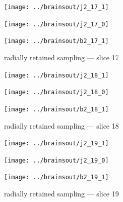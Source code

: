 \documentclass{article}
\begin{document}
\begin{figure}
\begin{centering}

\parbox{\imsize}{\texttt{[image: ../brainsout/j2\_17\_1]}}

\vspace{\vertsep}

\parbox{\imsize}{\texttt{[image: ../brainsout/j2\_17\_0]}}

\vspace{\vertsep}

\parbox{\imsize}{\texttt{[image: ../brainsout/b2\_17\_1]}}

\end{centering}
\caption{radially retained sampling --- slice 17}
\end{figure}


\begin{figure}
\begin{centering}

\parbox{\imsize}{\texttt{[image: ../brainsout/j2\_18\_1]}}

\vspace{\vertsep}

\parbox{\imsize}{\texttt{[image: ../brainsout/j2\_18\_0]}}

\vspace{\vertsep}

\parbox{\imsize}{\texttt{[image: ../brainsout/b2\_18\_1]}}

\end{centering}
\caption{radially retained sampling --- slice 18}
\end{figure}


\begin{figure}
\begin{centering}

\parbox{\imsize}{\texttt{[image: ../brainsout/j2\_19\_1]}}

\vspace{\vertsep}

\parbox{\imsize}{\texttt{[image: ../brainsout/j2\_19\_0]}}

\vspace{\vertsep}

\parbox{\imsize}{\texttt{[image: ../brainsout/b2\_19\_1]}}

\end{centering}
\caption{radially retained sampling --- slice 19}
\end{figure}
\end{document}
